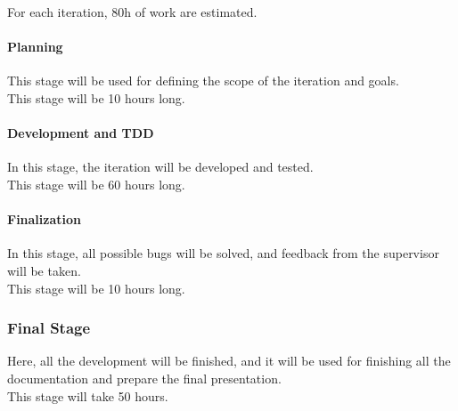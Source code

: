 For each iteration, 80h of work are estimated.
\paragraph{Planning\\}
This stage will be used for defining the scope of the iteration and goals.\\

This stage will be 10 hours long.
\paragraph{Development and TDD\\}
In this stage, the iteration will be developed and tested.\\

This stage will be 60 hours long.
\paragraph{Finalization\\}
In this stage, all possible bugs will be solved, and feedback from the supervisor will be taken.\\

This stage will be 10 hours long.


\subsubsection{Final Stage}
Here, all the development will be finished, and it will be used for finishing all the documentation and prepare the final presentation.\\

This stage will take 50 hours.

